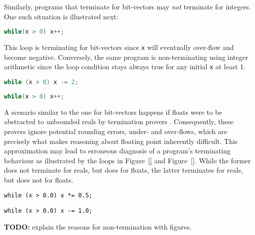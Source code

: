 \documentclass[preprint]{sigplanconf}
\theoremstyle{definition}
\newcommand{\todo}[1]{{\bf TODO:} #1}
\begin{document}
Similarly, programs that terminate for bit-vectors may \emph{not} terminate for integers. One such situation is illustrated next:  
 \begin{lstlisting}[language=C]
 while(x > 0) x++;
 \end{lstlisting}
This loop is  terminating for bit-vectors since \texttt{x}
will eventually over-flow and become negative. Conversely, the same program is non-terminating using integer
arithmetic since the loop condition stays always true for any initial \texttt{x} at least 1.


\begin{lstlisting}[language=C]
while (x > 0) x -= 2;
\end{lstlisting}

\begin{lstlisting}[language=C]
 while(x > 0) x++;
 \end{lstlisting}

A scenario similar to the one for bit-vectors happens if floats were to be abstracted to unbounded reals by termination provers \cite{}. 
Consequently, these provers ignore potential rounding errors, under- and over-flows, which are precisely what makes  reasoning about floating point inherently difficult.
This approximation may lead to erroneous diagnosis of a program's terminating behaviour as illustrated by the loops in Figure~\ref{} and Figure~\ref{}.
While the former does not terminate for reals, but does for floats, the latter 
terminates for reals, but does not for floats.

\begin{lstlisting}
while (x > 0.0) x *= 0.5;
\end{lstlisting}

\begin{lstlisting}
while (x > 0.0) x -= 1.0;
\end{lstlisting}
\todo{explain the reasons for non-termination with figures.}\\


\end{document}
